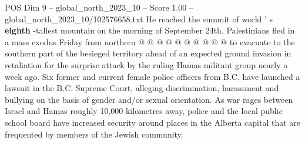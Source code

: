 \begin{textsample}{POS Dim 9 – global\_north\_2023\_10 – Score 1.00 – global\_north\_2023\_10/102576658.txt}
He reached the summit of world ' s \textbf{eighth} -tallest mountain on the morning of September 24th.
Palestinians fled in a mass exodus Friday from northern @ @ @ @ @ @ @ @ @ @ to evacuate to the southern part of the besieged territory ahead of an expected ground invasion in retaliation for the surprise attack by the ruling Hamas militant group nearly a week ago.
Six former and current female police officers from B.C. have launched a lawsuit in the B.C.
Supreme Court, alleging discrimination, harassment and bullying on the basis of gender and/or sexual orientation.
As war rages between Israel and Hamas roughly 10,000 kilometres away, police and the local public school board have increased security around places in the Alberta capital that are frequented by members of the Jewish community.

\end{textsample}

